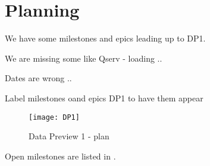 \section{Planning} \label{sec:plan}

We have some milestones and epics leading up to DP1.

We are missing some like Qserv - loading ..

Dates are wrong ..

Label milestones oand epics DP1 to have them appear

\begin{figure}
\begin{centering}
\texttt{[image: DP1]}
	\caption{Data Preview 1 - plan \label{fig:plan}}
\end{centering}
\end{figure}



Open milestones are listed in .

